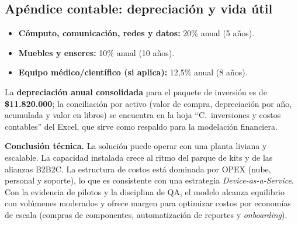 \subsection{Apéndice contable: depreciación y vida útil}
\begin{itemize}
    \item \textbf{Cómputo, comunicación, redes y datos:} 20\% anual (5 años).
    \item \textbf{Muebles y enseres:} 10\% anual (10 años).
    \item \textbf{Equipo médico/científico (si aplica):} 12{,}5\% anual (8 años).
\end{itemize}
La \textbf{depreciación anual consolidada} para el paquete de inversión es de \textbf{\$11.820.000}; la conciliación por activo (valor de compra, depreciación por año, acumulada y valor en libros) se encuentra en la hoja ``C.~inversiones y costos contables'' del Excel, que sirve como respaldo para la modelación financiera.

\medskip
\textbf{Conclusión técnica.} La solución puede operar con una planta liviana y escalable. La capacidad instalada crece al ritmo del parque de kits y de las alianzas B2B2C. La estructura de costos está dominada por OPEX (nube, personal y soporte), lo que es consistente con una estrategia \emph{Device-as-a-Service}. Con la evidencia de pilotos y la disciplina de QA, el modelo alcanza equilibrio con volúmenes moderados y ofrece margen para optimizar costos por economías de escala (compras de componentes, automatización de reportes y \emph{onboarding}).